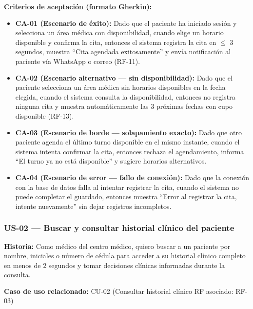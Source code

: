 \documentclass[11pt,a4paper]{article}
\providecommand{\tightlist}{%
	\setlength{\itemsep}{0pt}\setlength{\parskip}{0pt}}
\begin{document}
	\textbf{Criterios de aceptación (formato Gherkin):}
	
	\begin{itemize}
		\tightlist
		\item
		\textbf{CA-01 (Escenario de éxito):} Dado que el paciente ha iniciado sesión y selecciona un área médica con disponibilidad, cuando elige un horario disponible y confirma la cita, entonces el sistema registra la cita en \(\leq\) 3 segundos, muestra ``Cita agendada exitosamente'' y envía notificación al paciente vía WhatsApp o correo (RF-11).
		\item
		\textbf{CA-02 (Escenario alternativo --- sin disponibilidad):} Dado que el paciente selecciona un área médica sin horarios disponibles en la fecha elegida, cuando el sistema consulta la disponibilidad, entonces no registra ninguna cita y muestra automáticamente las 3 próximas fechas con cupo disponible (RF-13).
		\item
		\textbf{CA-03 (Escenario de borde --- solapamiento exacto):} Dado que otro paciente agenda el último turno disponible en el mismo instante, cuando el sistema intenta confirmar la cita, entonces rechaza el agendamiento, informa ``El turno ya no está disponible'' y sugiere horarios alternativos.
		\item
		\textbf{CA-04 (Escenario de error --- fallo de conexión):} Dado que la conexión con la base de datos falla al intentar registrar la cita, cuando el sistema no puede completar el guardado, entonces muestra ``Error al registrar la cita, intente nuevamente'' sin dejar registros incompletos.
	\end{itemize}
	
	\subsubsection{US-02 --- Buscar y consultar historial clínico del paciente}
	
	\textbf{Historia:} Como médico del centro médico, quiero buscar a un paciente por nombre, iniciales o número de cédula para acceder a su historial clínico completo en menos de 2 segundos y tomar decisiones clínicas informadas durante la consulta.
	
	\textbf{Caso de uso relacionado:} CU-02 (Consultar historial clínico \textbar{} RF asociado: RF-03)
	
\end{document}

